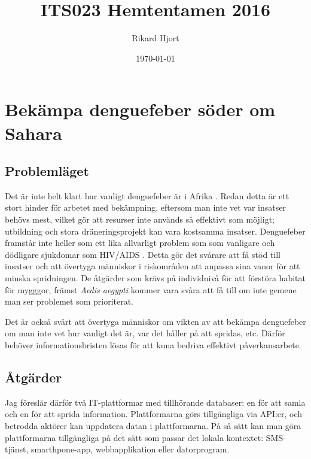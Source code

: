 \documentclass{article}
\title{ITS023 Hemtentamen 2016}
\date{\today}
\author{Rikard Hjort}
\begin{document}
\maketitle

\section{Bekämpa denguefeber söder om Sahara}

\subsection{Problemläget}

Det är inte helt klart hur vanligt denguefeber är i Afrika . Redan detta är ett stort hinder för arbetet med bekämpning, eftersom man inte vet var insatser behövs mest, vilket gör att resurser inte används så effektivt som möjligt; utbildning och stora dräneringsprojekt kan vara kostsamma insatser. Denguefeber framstår inte heller som ett lika allvarligt problem som som vanligare och dödligare sjukdomar som HIV/AIDS . Detta gör det svårare att få stöd till insatser och att övertyga människor i riskområden att anpassa sina vanor för att minska spridningen. De åtgärder som krävs på individnivå för att förstöra habitat för mygggor, främst \emph{Aedis aegypti}  kommer vara svåra att få till om inte gemene man ser problemet som prioriterat.

Det är också svårt att övertyga människor om vikten av att bekämpa denguefeber om man inte vet hur vanligt det är, var det håller på att spridas, etc. Därför behöver informationsbristen lösas för att kuna bedriva effektivt påverkansarbete.

\subsection{Åtgärder}

Jag föreslår därför två IT-plattformar med tillhörande databaser: en för att samla och en för att sprida information. Plattformarna görs tillgängliga via API:er, och betrodda aktörer kan uppdatera datan i plattformarna. På så sätt kan man göra plattformarna tillgängliga på det sätt som passar det lokala kontextet: SMS-tjänst, smarthpone-app, webbapplikation eller datorprogram.
\end{document}

